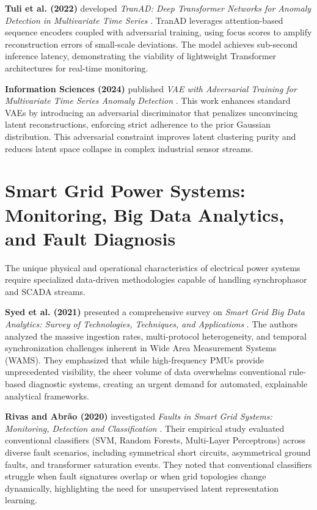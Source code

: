 \documentclass[12pt,a4paper]{report}
\begin{document}
\textbf{Tuli et al. (2022)} developed \textit{TranAD: Deep Transformer Networks for Anomaly Detection in Multivariate Time Series} \cite{ref_tuli2022_tranad}. TranAD leverages attention-based sequence encoders coupled with adversarial training, using focus scores to amplify reconstruction errors of small-scale deviations. The model achieves sub-second inference latency, demonstrating the viability of lightweight Transformer architectures for real-time monitoring.

\textbf{Information Sciences (2024)} published \textit{VAE with Adversarial Training for Multivariate Time Series Anomaly Detection} \cite{ref_adv_vae2024}. This work enhances standard VAEs by introducing an adversarial discriminator that penalizes unconvincing latent reconstructions, enforcing strict adherence to the prior Gaussian distribution. This adversarial constraint improves latent clustering purity and reduces latent space collapse in complex industrial sensor streams.

\section{Smart Grid Power Systems: Monitoring, Big Data Analytics, and Fault Diagnosis}
The unique physical and operational characteristics of electrical power systems require specialized data-driven methodologies capable of handling synchrophasor and SCADA streams.

\textbf{Syed et al. (2021)} presented a comprehensive survey on \textit{Smart Grid Big Data Analytics: Survey of Technologies, Techniques, and Applications} \cite{ref_syed2021_smartgrid}. The authors analyzed the massive ingestion rates, multi-protocol heterogeneity, and temporal synchronization challenges inherent in Wide Area Measurement Systems (WAMS). They emphasized that while high-frequency PMUs provide unprecedented visibility, the sheer volume of data overwhelms conventional rule-based diagnostic systems, creating an urgent demand for automated, explainable analytical frameworks.

\textbf{Rivas and Abr\~{a}o (2020)} investigated \textit{Faults in Smart Grid Systems: Monitoring, Detection and Classification} \cite{ref_rivas2020_faults}. Their empirical study evaluated conventional classifiers (SVM, Random Forests, Multi-Layer Perceptrons) across diverse fault scenarios, including symmetrical short circuits, asymmetrical ground faults, and transformer saturation events. They noted that conventional classifiers struggle when fault signatures overlap or when grid topologies change dynamically, highlighting the need for unsupervised latent representation learning.
\end{document}
